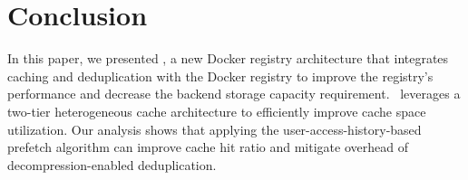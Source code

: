 \section{Conclusion}
\label{sec:conclusion}
In this paper, we presented \sysname, a new Docker registry architecture that integrates caching and deduplication with the Docker registry to
improve the registry's performance and decrease the backend storage capacity requirement. 
\sysname~leverages a two-tier heterogeneous cache architecture to efficiently improve cache space 
utilization. Our analysis shows that applying the user-access-history-based prefetch algorithm can improve cache hit ratio and mitigate overhead of decompression-enabled deduplication.
